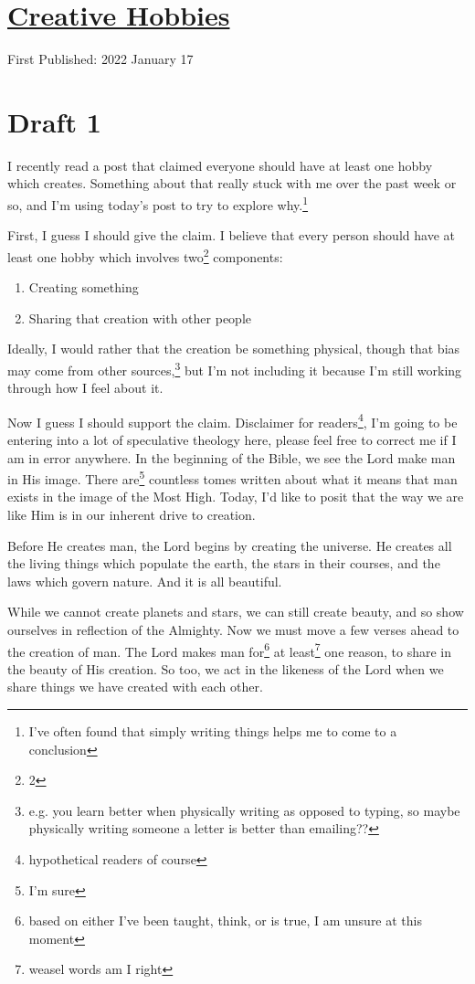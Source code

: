 \documentclass[12pt]{article}[titlepage]
\newcommand{\1}{\={a}}
\newcommand{\2}{\={e}}
\newcommand{\3}{\={\i}}
\newcommand{\4}{\=o}
\newcommand{\5}{\=u}
\newcommand{\6}{\={A}}
\renewcommand{\,}{\textsuperscript{,}}
\begin{document}
\doublespacing
\section{\href{creative-hobbies.html}{Creative Hobbies}}
First Published: 2022 January 17

\section{Draft 1}
I recently read a post that claimed everyone should have at least one hobby which creates.
Something about that really stuck with me over the past week or so, and I'm using today's post to try to explore why.\footnote{I've often found that simply writing things helps me to come to a conclusion}

First, I guess I should give the claim.
I believe that every person should have at least one hobby which involves two\footnote{2} components:
\begin{enumerate}
\item Creating something
\item Sharing that creation with other people
\end{enumerate}
Ideally, I would rather that the creation be something physical, though that bias may come from other sources,\footnote{e.g. you learn better when physically writing as opposed to typing, so maybe physically writing someone a letter is better than emailing??} but I'm not including it because I'm still working through how I feel about it.

Now I guess I should support the claim.
Disclaimer for readers\footnote{hypothetical readers of course}, I'm going to be entering into a lot of speculative theology here, please feel free to correct me if I am in error anywhere.
In the beginning of the Bible, we see the Lord make man in His image.
There are\footnote{I'm sure} countless tomes written about what it means that man exists in the image of the Most High.
Today, I'd like to posit that the way we are like Him is in our inherent drive to creation.

Before He creates man, the Lord begins by creating the universe.
He creates all the living things which populate the earth, the stars in their courses, and the laws which govern nature.
And it is all beautiful.

While we cannot create planets and stars, we can still create beauty, and so show ourselves in reflection of the Almighty.
Now we must move a few verses ahead to the creation of man.
The Lord makes man for\footnote{based on either I've been taught, think, or is true, I am unsure at this moment} at least\footnote{weasel words am I right} one reason, to share in the beauty of His creation.
So too, we act in the likeness of the Lord when we share things we have created with each other.
\end{document}
